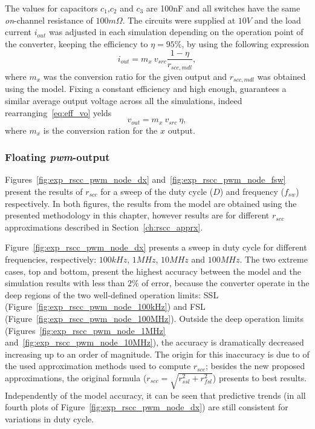 The values for capacitors $c_1$,$c_2$ and $c_3$ are 100nF and all switches have the same \emph{on}-channel resistance of $100m\Omega$. The circuits were supplied at $10V$ and the load current $i_{out}$ was adjusted in each simulation depending on the operation point of the converter, keeping the efficiency to $\eta=95\%$, by using the following expression
\begin{equation}
    i_{out}=m_x~v_{src}\frac{1-\eta}{r_{scc,mdl}},
\label{eq:iout_eff}
\end{equation}
where $m_x$ was the conversion ratio for the given output and $r_{scc,mdl}$ was obtained using the model. Fixing a constant efficiency and high enough, guarantees a similar average output voltage across all the simulations, indeed rearranging~\eqref{eq:eff_vo} yelds
\begin{equation}
    v_{out}=m_x~v_{src}~\eta,
\label{eq:vout_eff}
\end{equation}
where $m_x$ is the conversion ration for the $x$ output.

\subsubsection{ Floating \emph{pwm}-output }
Figures~\ref{fig:exp_rscc_pwm_node_dx} and~\ref{fig:exp_rscc_pwm_node_fsw} present the results of $r_{scc}$ for a sweep of the duty cycle ($D$) and frequency ($f_{sw}$) respectively. In both figures, the results from the model are obtained using the presented methodology in this chapter, however results are for different $r_{scc}$ approximations described in Section~\ref{ch:rscc_apprx}.

Figure~\ref{fig:exp_rscc_pwm_node_dx} presents a sweep in duty cycle for different frequencies, respectively: $100kHz$, $1MHz$, $10MHz$ and $100MHz$. The two extreme cases, top and bottom, present the highest accuracy between the model and the simulation results with less than $2\%$ of error, because the converter operate in the deep regions of the two well-defined operation limits: SSL (Figure~\ref{fig:exp_rscc_pwm_node_100kHz}) and FSL (Figure~\ref{fig:exp_rscc_pwm_node_100MHz}). Outside the deep operation limits (Figures~\ref{fig:exp_rscc_pwm_node_1MHz} and~\ref{fig:exp_rscc_pwm_node_10MHz}), the accuracy is dramatically decreased increasing up to an order of magnitude. The origin for this inaccuracy is due to of the used approximation methods used to compute $r_{scc}$; besides the new proposed approximations, the original formula ($r_{scc} = \sqrt{r_{ssl}^2 + r_{fsl}^2}$) presents to best results. Independently of the model accuracy, it can be seen that predictive trends (in all fourth plots of Figure~\ref{fig:exp_rscc_pwm_node_dx}) are still consistent for variations in duty cycle.

